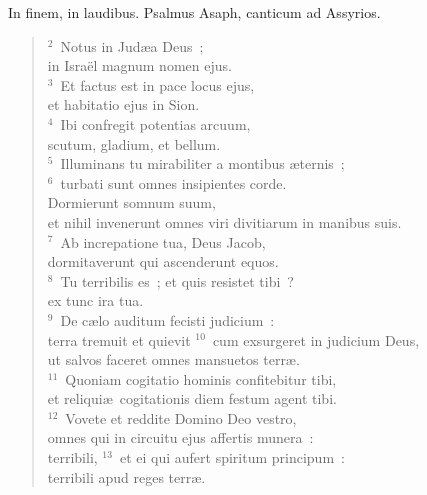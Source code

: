 \bchapter
\lettrine[lines=3,image=true,loversize=0.05,lraise=-0.03]{I}{}n finem, in laudibus. Psalmus Asaph, canticum ad Assyrios.
\begin{flushleft}\begin{verse}\vspace{6pt}${}^{2}$~Notus in Jud\ae a Deus~;\\ in Isra\"el magnum nomen ejus.\\
${}^{3}$~Et factus est in pace locus ejus,\\ et habitatio ejus in Sion.\\
${}^{4}$~Ibi confregit potentias arcuum,\\ scutum, gladium, et bellum.\\
${}^{5}$~Illuminans tu mirabiliter a montibus \ae ternis~;\\
${}^{6}$~turbati sunt omnes insipientes corde.\\ Dormierunt somnum suum,\\ et nihil invenerunt omnes viri divitiarum in manibus suis.\\
${}^{7}$~Ab increpatione tua, Deus Jacob,\\ dormitaverunt qui ascenderunt equos.\\
${}^{8}$~Tu terribilis es~; et quis resistet tibi~?\\ ex tunc ira tua.\\
${}^{9}$~De c\ae lo auditum fecisti judicium~:\\ terra tremuit et quievit
${}^{10}$~cum exsurgeret in judicium Deus,\\ ut salvos faceret omnes mansuetos terr\ae .\\
${}^{11}$~Quoniam cogitatio hominis confitebitur tibi,\\ et reliqui\ae\ cogitationis diem festum agent tibi.\\
${}^{12}$~Vovete et reddite Domino Deo vestro,\\ omnes qui in circuitu ejus affertis munera~:\\ terribili,
${}^{13}$~et ei qui aufert spiritum principum~:\\ terribili apud reges terr\ae .\end{verse}\end{flushleft}



